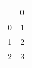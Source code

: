 \begin{tabular}{lr}
\toprule
{} &  0 \\
\midrule
0 &  1 \\
1 &  2 \\
2 &  3 \\
\bottomrule
\end{tabular}
